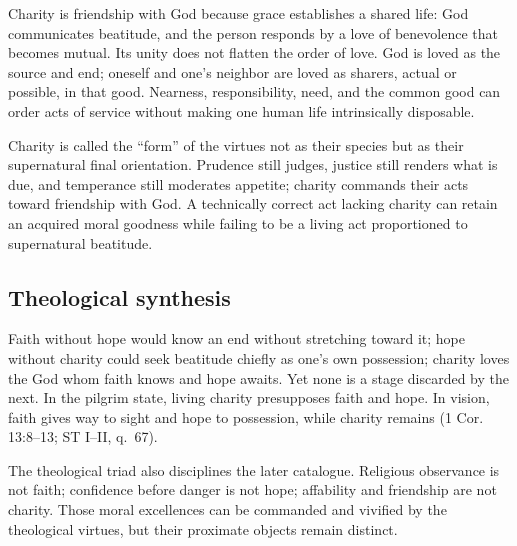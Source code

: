 Charity is friendship with God because grace establishes a shared life: God communicates beatitude, and the person responds by a love of benevolence that becomes mutual. Its unity does not flatten the order of love. God is loved as the source and end; oneself and one's neighbor are loved as sharers, actual or possible, in that good. Nearness, responsibility, need, and the common good can order acts of service without making one human life intrinsically disposable.

Charity is called the ``form'' of the virtues not as their species but as their supernatural final orientation. Prudence still judges, justice still renders what is due, and temperance still moderates appetite; charity commands their acts toward friendship with God. A technically correct act lacking charity can retain an acquired moral goodness while failing to be a living act proportioned to supernatural beatitude.

\subsection{Theological synthesis}

Faith without hope would know an end without stretching toward it; hope without charity could seek beatitude chiefly as one's own possession; charity loves the God whom faith knows and hope awaits. Yet none is a stage discarded by the next. In the pilgrim state, living charity presupposes faith and hope. In vision, faith gives way to sight and hope to possession, while charity remains (1 Cor. 13:8--13; ST I--II, q.~67).

The theological triad also disciplines the later catalogue. Religious observance is not faith; confidence before danger is not hope; affability and friendship are not charity. Those moral excellences can be commanded and vivified by the theological virtues, but their proximate objects remain distinct.
